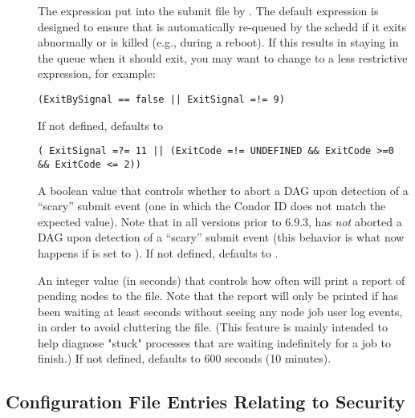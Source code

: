 \begin{description}
\item[]
\label{param:DAGManOnExitRemove}
The  expression put into the  submit
file by .
The default expression is designed to ensure that  is
automatically re-queued by the schedd if it exits abnormally or is
killed (e.g., during a reboot).  If this results in 
staying in the queue when it should exit, you may want to change
to a less restrictive expression, for example:
\begin{verbatim}
(ExitBySignal == false || ExitSignal =!= 9)
\end{verbatim}
If not defined,  defaults to
\begin{verbatim}
( ExitSignal =?= 11 || (ExitCode =!= UNDEFINED && ExitCode >=0 && ExitCode <= 2))
\end{verbatim}

\item[]
\label{param:DAGManAbortOnScarySubmit}
A boolean value that controls whether to abort a DAG upon detection of
a ``scary'' submit event (one in which the Condor ID does not match
the expected value).  Note that in all versions prior to 6.9.3,
 has \emph{not} aborted a DAG upon detection of
a ``scary'' submit event (this behavior is what now happens if
 is set to ).
If not defined,  defaults to
.

\item[]
\label{param:DAGManPendingReportInterval}
An integer value (in seconds) that controls how often 
will print a report of pending nodes to the  file.
Note that the report will only be printed if  has
been waiting at least 
seconds without seeing any node job user log events, in order to
avoid cluttering the  file.  (This feature is mainly
intended to help diagnose "stuck"  processes that
are waiting indefinitely for a job to finish.) If not defined,
 defaults to 600 seconds
(10 minutes).

\end{description}

\subsection{\label{sec:Config-Security}Configuration File Entries
Relating to Security}

